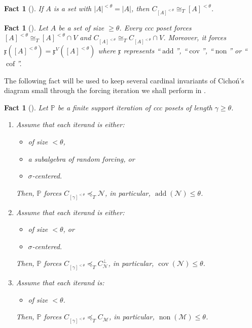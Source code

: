 \documentclass[a4paper,12pt]{amsart}
\newtheorem{fac}[thm]{Fact}
\theoremstyle{definition}
\numberwithin{thm}{section}
\numberwithin{equation}{section}
\newcommand{\p}{\mathbb{P}}
\newcommand{\m}{\mathcal{M}}
\newcommand{\n}{\mathcal{N}}
\DeclareMathOperator{\non}{non}
\DeclareMathOperator{\cov}{cov}
\DeclareMathOperator{\add}{add}
\DeclareMathOperator{\cof}{cof}
\newcommand{\nonm}{\non(\mathcal{M})}
\newcommand{\covn}{\cov(\mathcal{N})}
\newcommand{\addn}{\add(\mathcal{N})}
\renewcommand{\lq}{\preceq_T}
\begin{document}
    \begin{fac}[{\cite[Lemma 1.15]{CM22}}] 
        \label{fac_suff_eq_CI_and_I}
    	If $A$ is a set with $|A|^{<\theta}=|A|$, then $C_{[A]^{<\theta}}\cong_T [A]^{<\theta}$.
    \end{fac}
    
    \begin{fac}[{\cite[Lemma 2.11]{CM22}}]\label{fac_cap_V}
    	Let $A$ be a set of size $\geq\theta$. Every ccc poset forces $[A]^{<\theta}\cong_T[A]^{<\theta}\cap V$ and $C_{[A]^{<\theta}}\cong_T C_{[A]^{<\theta}}\cap V$. Moreover, it forces $\mathfrak{x}([A]^{<\theta})=\mathfrak{x}^V([A]^{<\theta})$ where $\mathfrak{x}$ represents ``$\add$'', ``$\cov$'', ``$\non$'' or ``$\cof$''.
    \end{fac}
    
    The following fact will be used to keep several cardinal invariants of Cicho\'n's diagram small through the forcing iteration we shall perform in .
    
    \begin{fac}[{\cite[Corollary 2.16, also Example 2.15]{Yam25}}]
    	\label{fac:smallness_for_addn_and_covn_and_nonm}
    	Let $\p$ be a finite support iteration of ccc posets of length $\gamma\geq\theta$.		
    	\begin{enumerate}
    		\item Assume that each iterand is either:
    		\begin{itemize}
    			\item of size $<\theta$,
    			\item a subalgebra of random forcing, or
    			\item $\sigma$-centered.
    		\end{itemize}
    		Then, $\p$ forces $C_{[\gamma]^{<\theta}}\lq\n$,
    		in particular, $\addn\leq\theta$.
    		\item  Assume that each iterand is either:
    		\begin{itemize}
    			\item of size $<\theta$, or
    			\item $\sigma$-centered.
    		\end{itemize}
    		Then, $\p$ forces $C_{[\gamma]^{<\theta}}\lq C_\n^\bot$,
    		in particular, $\covn\leq\theta$.
    		\item Assume that each iterand is:
    		\begin{itemize}
    			\item of size $<\theta$.
    		\end{itemize}
    		Then, $\p$ forces $C_{[\gamma]^{<\theta}}\lq C_\m$, in particular, $\nonm\leq\theta$.
    	\end{enumerate}
    \end{fac}
    
\end{document}
